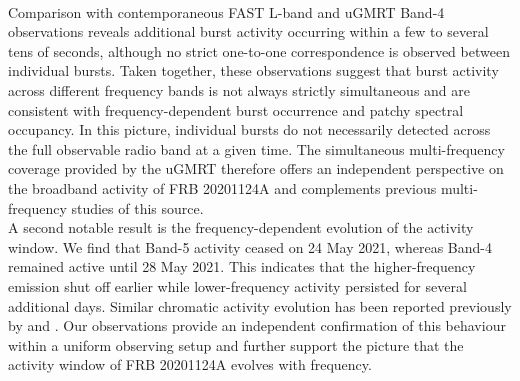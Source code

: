 \documentclass[preprint2, trackchanges]{aastex631}
\begin{document}
\\
Comparison with contemporaneous FAST L-band \citep{Xu2022} and uGMRT Band-4 observations reveals additional burst activity occurring within a few to several tens of seconds, although no strict one-to-one correspondence is observed between individual bursts. Taken together, these observations suggest that burst activity across different frequency bands is not always strictly simultaneous and are consistent with frequency-dependent burst occurrence and patchy spectral occupancy. In this picture, individual bursts do not necessarily detected across the full observable radio band at a given time. The simultaneous multi-frequency coverage provided by the uGMRT therefore offers an independent perspective on the broadband activity of FRB 20201124A and complements previous multi-frequency studies of this source.
\\
A second notable result is the frequency-dependent evolution of the activity window. We find that Band-5 activity ceased on 24 May 2021, whereas Band-4 remained active until 28 May 2021. This indicates that the higher-frequency emission shut off earlier while lower-frequency activity persisted for several additional days. Similar chromatic activity evolution has been reported previously by \citet{Kirsten2024} and \citet{2025A&A...696A.194B}. Our observations provide an independent confirmation of this behaviour within a uniform observing setup and further support the picture that the activity window of FRB 20201124A evolves with frequency.
\\
\end{document}
